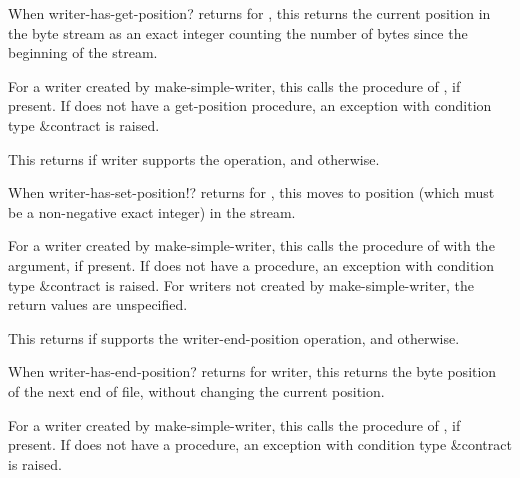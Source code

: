 \begin{entry}{%
}
   
When {\cf writer-has-get-position?} returns \schtrue{} for
, this returns the current position in the byte stream as
an exact integer counting the number of bytes since the beginning of
the stream.
  
For a writer created by {\cf make-simple-writer}, this calls the
 procedure of , if present. If 
does not have a get-position procedure, an exception with condition
type {\cf\&contract} is raised.
\end{entry}

\begin{entry}{%
}
   
This returns \schtrue{} if writer supports the  operation, and
\schfalse{} otherwise.
\end{entry}

\begin{entry}{%
}
   
When {\cf writer-has-set-position!?} returns \schtrue{} for
, this moves to position  (which must be a non-negative
exact integer) in the stream.
   
For a writer created by {\cf make-simple-writer}, this calls the
  procedure of  with the 
argument, if present. If  does not have a
 procedure, an exception with condition type
{\cf\&contract} is raised.  For writers not created by {\cf
  make-simple-writer}, the return values are unspecified.
\end{entry}

\begin{entry}{%
}
   
This returns \schtrue{} if  supports the {\cf
  writer-end-position} operation, and \schfalse{} otherwise.
\end{entry}

\begin{entry}{%
}
   
When {\cf writer-has-end-position?} returns \schtrue{} for writer,
this returns the byte position of the next end of file, without
changing the current position.
   
For a writer created by {\cf make-simple-writer}, this calls the
 procedure of , if present. If 
does not have a  procedure, an exception with condition
type {\cf\&contract} is raised.
\end{entry}

